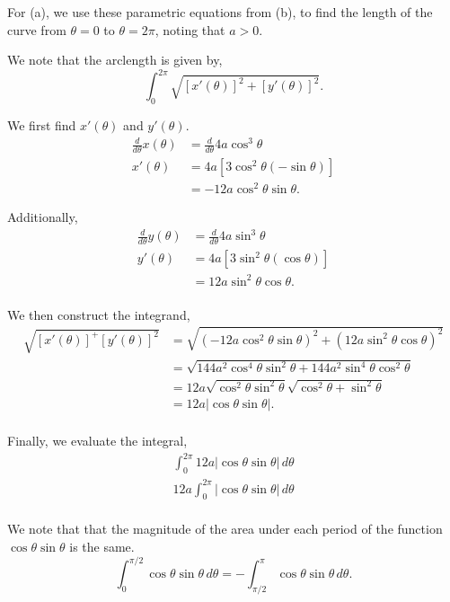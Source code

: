 \documentclass[../hw10]{subfiles}
\begin{document}
For (a), we use these parametric equations from (b), to find the length of the curve from $\theta=0$ to $\theta=2\pi$, noting that $a>0$.

We note that the arclength is given by,
\[\int_{0}^{2\pi} \sqrt{{[x'(\theta)]}^2+{[y'(\theta)]}^2}.\]

We first find $x'(\theta)$ and $y'(\theta)$.
\begin{align*}
    \frac{d}{d\theta}x(\theta)&=\frac{d}{d\theta}4a\cos^3{\theta}\\
    x'(\theta)&=4a\left[ 3\cos^2{\theta}(-\sin{\theta}) \right] \\
    &= -12a\cos^2{\theta}\sin{\theta}.
\end{align*}

Additionally,
\begin{align*}
    \frac{d}{d\theta}y(\theta)&=\frac{d}{d\theta}4a\sin^3{\theta} \\
    y'(\theta)&= 4a\left[ 3\sin^2{\theta}(\cos{\theta}) \right] \\
    &= 12a\sin^2{\theta}\cos{\theta}. \\
\end{align*}

We then construct the integrand,
\begin{align*}
    \sqrt{{[x'(\theta)]}^+{[y'(\theta)]}^2}&= \sqrt{{\left( -12a\cos^2{\theta}\sin{\theta} \right)}^2+{\left( 12a\sin^2{\theta}\cos{\theta} \right)}^2}\\
    &= \sqrt{144a^2\cos^4{\theta}\sin^2{\theta}+144a^2\sin^4{\theta}\cos^2{\theta}} \\
    &= 12a\sqrt{\cos^2{\theta}\sin^2{\theta}}\sqrt{\cos^2{\theta}+\sin^2{\theta}} \\
    &= 12a|\cos{\theta}\sin{\theta}|. \\
\end{align*}

Finally, we evaluate the integral,
\begin{align*}
    \int_{0}^{2\pi} 12a|\cos{\theta}\sin{\theta}|\, d\theta \\
    12a \int_{0}^{2\pi} |\cos{\theta}\sin{\theta}|\, d\theta \\
\end{align*}

We note that that the magnitude of the area under each period of the function $\cos{\theta}\sin{\theta}$ is the same.
\[\int_{0}^{\pi/2} \cos{\theta}\sin{\theta}\, d\theta = -\int_{\pi/2}^{\pi} \cos{\theta}\sin{\theta} \, d\theta.\]
\end{document}
